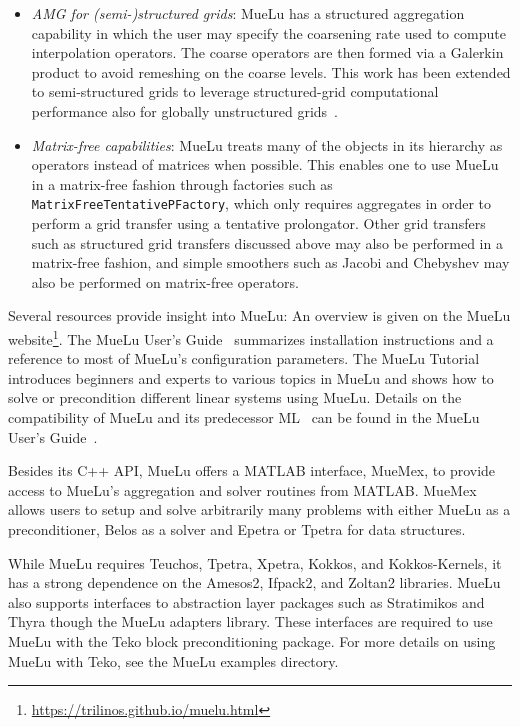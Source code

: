 \begin{itemize}
\item \emph{AMG for (semi-)structured grids}:
MueLu has a structured aggregation capability in which the user may specify the coarsening rate used to compute interpolation operators.
The coarse operators are then formed via a Galerkin product to avoid remeshing on the coarse levels.
This work has been extended to semi-structured grids to leverage structured-grid computational performance also for globally unstructured grids~\cite{Mayr2022a}.

\item \emph{Matrix-free capabilities}:
MueLu treats many of the objects in its hierarchy as operators instead of matrices when possible.
This enables one to use MueLu in a matrix-free fashion through factories such as \texttt{MatrixFreeTentativePFactory},
which only requires aggregates in order to perform a grid transfer using a tentative prolongator.
Other grid transfers such as structured grid transfers discussed above may also be performed in a matrix-free fashion,
and simple smoothers such as Jacobi and Chebyshev may also be performed on matrix-free operators.

\end{itemize}

Several resources provide insight into MueLu:
An overview is given on the MueLu website\footnote{\url{https://trilinos.github.io/muelu.html}}.
The MueLu User's Guide~\cite{BergerVergiat2023a} summarizes installation instructions and a reference to most of MueLu's configuration parameters.
The MueLu Tutorial~\cite{Mayr2023b} introduces beginners and experts to various topics in MueLu and shows how to solve or precondition different linear systems using MueLu.
Details on the compatibility of MueLu and its predecessor ML~\cite{Heroux2005a,Gee2006a} can be found in the MueLu User's Guide~\cite{BergerVergiat2023a}.

Besides its C++ API, MueLu offers a MATLAB interface, MueMex, to provide access to MueLu's aggregation and solver routines from MATLAB.
MueMex allows users to setup and solve arbitrarily many problems with either MueLu as a preconditioner, Belos as a solver and Epetra or Tpetra for data structures.

While MueLu requires Teuchos, Tpetra, Xpetra, Kokkos, and Kokkos-Kernels, it has a strong dependence 
on the Amesos2, Ifpack2, and Zoltan2 libraries.
MueLu also supports interfaces to abstraction layer packages such as Stratimikos and Thyra though the MueLu adapters library.
These interfaces are required to use MueLu with the Teko block preconditioning package.
For more details on using MueLu with Teko, see the MueLu examples directory.


